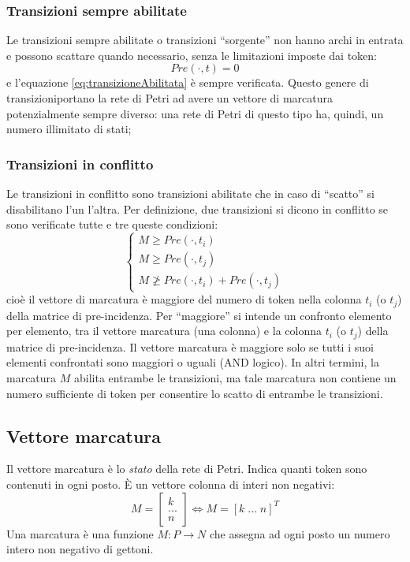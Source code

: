 \documentclass[a4paper]{report}
\begin{document}
\subsubsection{Transizioni sempre abilitate}
Le transizioni sempre abilitate o transizioni ``sorgente'' non
hanno archi in entrata e possono scattare quando necessario, senza
le limitazioni imposte dai token:
\[
Pre(\cdot,t) = 0
\]
e l'equazione \ref{eq:transizioneAbilitata} \`e sempre verificata.
Questo genere di transizioniportano la rete di Petri ad avere un
vettore di marcatura potenzialmente sempre diverso: una rete di
Petri di questo tipo ha, quindi, un numero illimitato di stati; 

\subsubsection{Transizioni in conflitto}
Le transizioni in conflitto sono transizioni abilitate che in caso di
``scatto'' si disabilitano l'un l'altra. Per definizione, due
transizioni si dicono in conflitto se sono verificate tutte e tre
queste condizioni:
\[
\left \{
\begin{array}{l}
  M \geq Pre(\cdot, t_i)\\
  M \geq Pre(\cdot, t_j)\\
  M \ngeq Pre(\cdot, t_i) + Pre(\cdot, t_j)
\end{array}
\right .
\]
cio\`e il vettore di marcatura \`e maggiore del numero di token nella
colonna $t_i$ (o $t_j$) della matrice di pre-incidenza. Per
``maggiore'' si intende un confronto elemento per
elemento, tra il vettore marcatura (una colonna) e la colonna $t_i$ (o
$t_j$) della matrice di pre-incidenza. Il vettore
marcatura \`e maggiore solo se tutti i suoi elementi confrontati sono
maggiori o uguali (AND logico). In altri termini, la marcatura $M$
abilita entrambe le transizioni, ma tale marcatura non contiene un
numero sufficiente di token per consentire lo scatto di entrambe le
transizioni. 

\subsection{Vettore marcatura}
Il vettore marcatura \`e lo {\em stato} della rete di Petri. Indica
quanti token sono contenuti in ogni posto. \`E un vettore colonna di
interi non negativi:
\[
M = 
 \begin{bmatrix}
  k\\
  ...\\
  n
 \end{bmatrix}
 \Leftrightarrow
 M = [ k \; ... \; n]^T
\]
Una marcatura \`e una funzione $M : P \rightarrow N$ che assegna ad
ogni posto un numero intero non negativo di gettoni.
\end{document}
